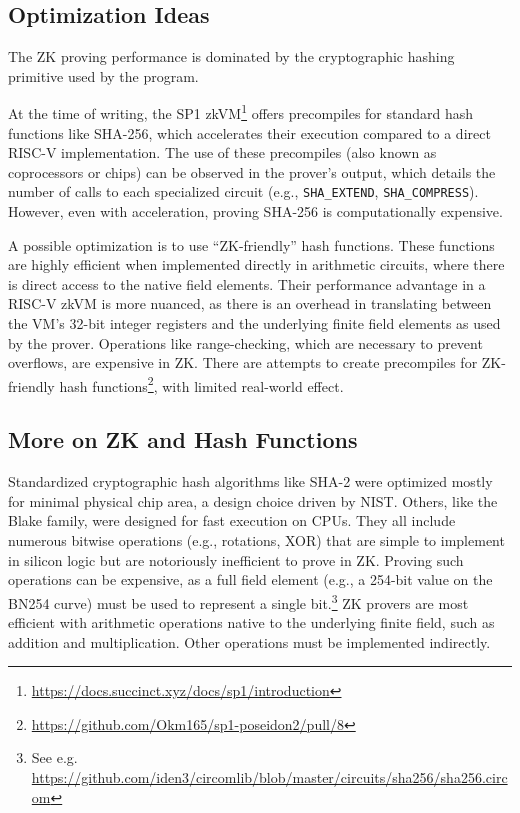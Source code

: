 \documentclass[twocolumn]{article}
\begin{document}
\subsection{Optimization Ideas}

The ZK proving performance is dominated by the cryptographic hashing primitive used by the program.

At the time of writing, the SP1 zkVM\footnote{\url{https://docs.succinct.xyz/docs/sp1/introduction}} offers precompiles for standard hash functions like SHA-256, which accelerates their execution compared to a direct RISC-V implementation. The use of these precompiles (also known as coprocessors or chips) can be observed in the prover's output, which details the number of calls to each specialized circuit (e.g., \lstinline|SHA_EXTEND|, \lstinline|SHA_COMPRESS|). However, even with acceleration, proving SHA-256 is computationally expensive.

A possible optimization is to use ``ZK-friendly'' hash functions. These functions are highly efficient when implemented directly in arithmetic circuits, where there is direct access to the native field elements. Their performance advantage in a RISC-V zkVM is more nuanced, as there is an overhead in translating between the VM's 32-bit integer registers and the underlying finite field elements as used by the prover. Operations like range-checking, which are necessary to prevent overflows, are expensive in ZK. There are attempts to create precompiles for ZK-friendly hash functions\footnote{\url{https://github.com/Okm165/sp1-poseidon2/pull/8}}, with limited real-world effect.


\subsection{More on ZK and Hash Functions}

Standardized cryptographic hash algorithms like SHA-2 were optimized mostly for minimal physical chip area, a design choice driven by NIST. Others, like the Blake family, were designed for fast execution on CPUs. They all include numerous bitwise operations (e.g., rotations, XOR) that are simple to implement in silicon logic but are notoriously inefficient to prove in ZK. Proving such operations can be expensive, as a full field element (e.g., a 254-bit value on the BN254 curve) must be used to represent a single bit.\footnote{See e.g. \url{https://github.com/iden3/circomlib/blob/master/circuits/sha256/sha256.circom}} ZK provers are most efficient with arithmetic operations native to the underlying finite field, such as addition and multiplication. Other operations must be implemented indirectly.
\end{document}
